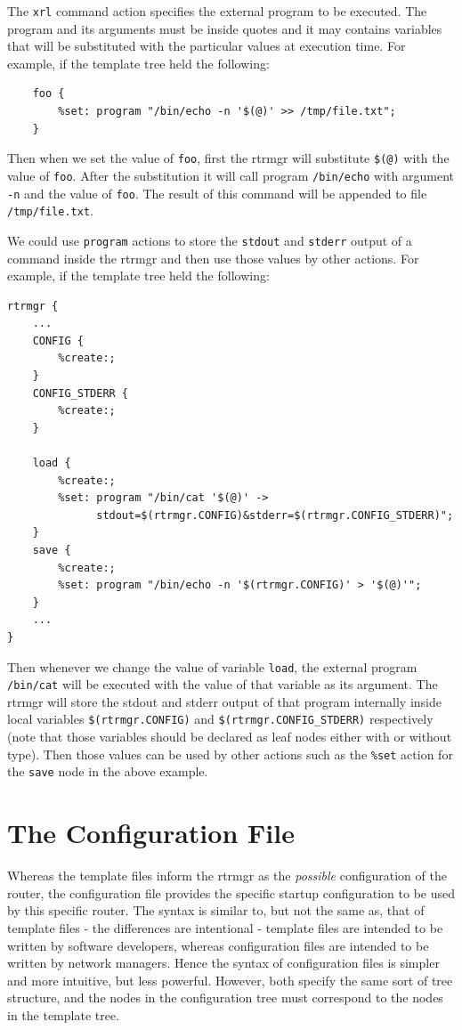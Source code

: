 \documentclass[11pt]{article}
\begin{document}
The {\tt xrl} command action specifies the external program to be executed.
The program and its arguments must be inside quotes and it may contains
variables that will be substituted with the particular values at execution
time.
For example, if the template tree held the following:

\begin{verbatim}
    foo {
        %set: program "/bin/echo -n '$(@)' >> /tmp/file.txt";
    }
\end{verbatim}

Then when we set the value of {\tt foo}, first the rtrmgr will substitute
{\tt \$(@)} with the value of {\tt foo}. After the substitution it will
call program {\tt /bin/echo} with argument {\tt -n} and the value
of {\tt foo}. The result of this command will be appended to file
{\tt /tmp/file.txt}.

We could use {\tt program} actions to store the {\tt stdout} and {\tt stderr}
output of a command inside the rtrmgr and then use those values by other
actions.
For example, if the template tree held the following:

\begin{verbatim}
rtrmgr {
    ...
    CONFIG {
        %create:;
    }
    CONFIG_STDERR {
        %create:;
    }

    load {
        %create:;
        %set: program "/bin/cat '$(@)' ->
              stdout=$(rtrmgr.CONFIG)&stderr=$(rtrmgr.CONFIG_STDERR)";
    }
    save {
        %create:;
        %set: program "/bin/echo -n '$(rtrmgr.CONFIG)' > '$(@)'";
    }
    ...
}
\end{verbatim}

Then whenever we change the value of variable {\tt load}, the external
program {\tt /bin/cat} will be executed with the value of that variable as
its argument. The rtrmgr will store the stdout and stderr output of
that program internally inside local variables {\tt \$(rtrmgr.CONFIG)}
and {\tt \$(rtrmgr.CONFIG\_STDERR)} respectively (note that those variables
should be declared as leaf nodes either with or without type).
Then those values can be used by other actions such as the {\tt \%set}
action for the {\tt save} node in the above example.

\newpage

\section{The Configuration File}

Whereas the template files inform the rtrmgr as the {\it possible}
configuration of the router, the configuration file provides the
specific startup configuration to be used by this specific router.
The syntax is similar to, but not the same as, that of template files -
the differences are intentional - template files are intended to be
written by software developers, whereas configuration files are
intended to be written by network managers.  Hence the syntax of
configuration files is simpler and more intuitive, but less powerful.
However, both specify the same sort of tree structure, and the nodes
in the configuration tree must correspond to the nodes in the template
tree.
\end{document}
